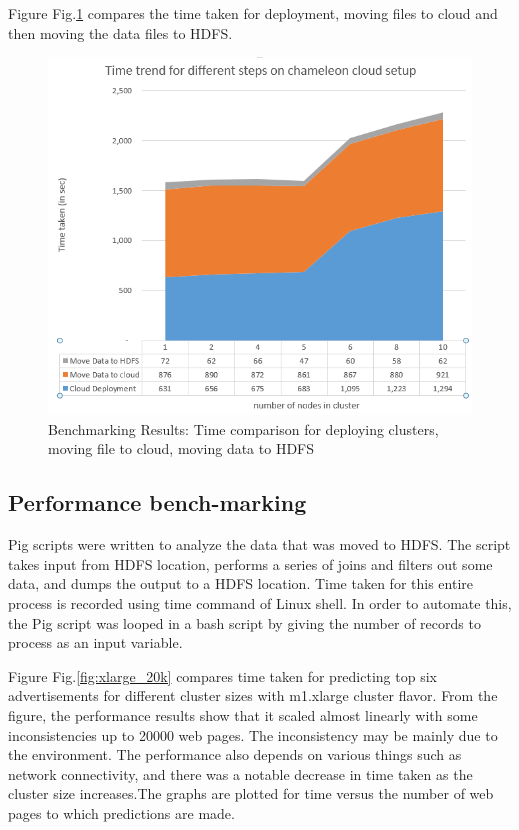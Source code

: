 \documentclass[9pt,twocolumn,twoside]{../../styles/osajnl}
\begin{document}
Figure Fig.\ref{fig:deployment_timetrend} compares the time taken for deployment, moving files to cloud and then moving the data files to HDFS.

\begin{figure}[hptb]
\centering
\includegraphics[width=\linewidth]{images/deployment_timetrend.PNG}
\caption{ Benchmarking Results: Time comparison for deploying clusters, moving file to cloud, moving data to HDFS}
\label{fig:deployment_timetrend}
\end{figure}

\subsection{Performance bench-marking}
Pig scripts were written to analyze the data that was moved to HDFS. The script takes input from HDFS location, performs a series of joins and filters out some data, and dumps the output to a HDFS location. Time taken for this entire process is recorded using time command of Linux shell. In order to automate this, the Pig script was looped in a bash script by giving the number of records to process as an input variable. 

Figure Fig.\ref{fig:xlarge_20k} compares time taken for predicting top six advertisements for different cluster sizes with m1.xlarge cluster flavor. From the figure, the performance results show that it scaled almost linearly with some inconsistencies up to 20000 web pages. The inconsistency may be mainly due to the environment. The performance also depends on various things such as network connectivity, and there was a notable decrease in time taken as the cluster size increases.The graphs are plotted for time versus the number of web pages to which predictions are made.
\end{document}
